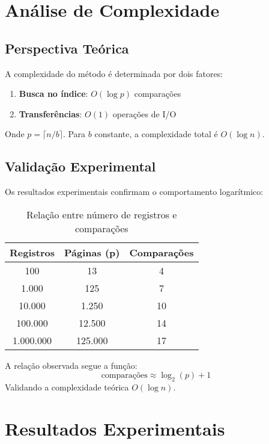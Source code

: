 \documentclass[12pt,a4paper,brazil]{article}
\begin{document}
\section{Análise de Complexidade}

\subsection{Perspectiva Teórica}
A complexidade do método é determinada por dois fatores:
\begin{enumerate}
    \item \textbf{Busca no índice}: \(O(\log p)\) comparações
    \item \textbf{Transferências}: \(O(1)\) operações de I/O
\end{enumerate}
Onde \(p = \lceil n/b \rceil\). Para \(b\) constante, a complexidade total é \(O(\log n)\).

\subsection{Validação Experimental}
Os resultados experimentais confirmam o comportamento logarítmico:

\begin{table}[H]
\centering
\caption{Relação entre número de registros e comparações}
\begin{tabular}{@{}ccc@{}}
\toprule
\textbf{Registros} & \textbf{Páginas (p)} & \textbf{Comparações} \\
\midrule
100 & 13 & 4 \\
1.000 & 125 & 7 \\
10.000 & 1.250 & 10 \\
100.000 & 12.500 & 14 \\
1.000.000 & 125.000 & 17 \\
\bottomrule
\end{tabular}
\end{table}

A relação observada segue a função:
\[
\text{comparações} \approx \log_2(p) + 1
\]
Validando a complexidade teórica \(O(\log n)\).

\section{Resultados Experimentais}
\end{document}
